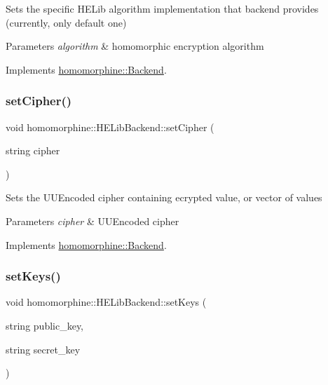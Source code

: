 Sets the specific H\+E\+Lib algorithm implementation that backend provides (currently, only default one)


\begin{DoxyParams}{Parameters}
{\em algorithm} & homomorphic encryption algorithm \\
\hline
\end{DoxyParams}


Implements \mbox{\hyperlink{classhomomorphine_1_1_backend_a69cc49ddff047e257a7d793ac240b08b}{homomorphine\+::\+Backend}}.

\mbox{\label{classhomomorphine_1_1_h_e_lib_backend_a5baa6ad05fbb23d27c4ec4bb018a8c64}} 
\subsubsection{\texorpdfstring{setCipher()}{setCipher()}}
{\footnotesize\ttfamily void homomorphine\+::\+H\+E\+Lib\+Backend\+::set\+Cipher (\begin{DoxyParamCaption}\item[{string}]{cipher }\end{DoxyParamCaption})\hspace{0.3cm}{\ttfamily [virtual]}}

Sets the U\+U\+Encoded cipher containing ecrypted value, or vector of values


\begin{DoxyParams}{Parameters}
{\em cipher} & U\+U\+Encoded cipher \\
\hline
\end{DoxyParams}


Implements \mbox{\hyperlink{classhomomorphine_1_1_backend_a29f49f5c862cf090ac98ade663e67c64}{homomorphine\+::\+Backend}}.

\mbox{\label{classhomomorphine_1_1_h_e_lib_backend_a2980c8eaf3556057aac364a1e61ab8cd}} 
\subsubsection{\texorpdfstring{setKeys()}{setKeys()}}
{\footnotesize\ttfamily void homomorphine\+::\+H\+E\+Lib\+Backend\+::set\+Keys (\begin{DoxyParamCaption}\item[{string}]{public\+\_\+key,  }\item[{string}]{secret\+\_\+key }\end{DoxyParamCaption})\hspace{0.3cm}{\ttfamily [virtual]}}


